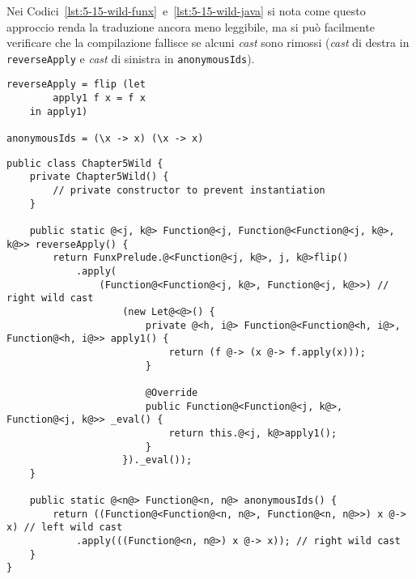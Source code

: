 \newpage

Nei Codici~\ref{lst:5-15-wild-funx}~e~\ref{lst:5-15-wild-java} si nota come questo approccio renda la traduzione ancora meno
leggibile, ma si può facilmente verificare che la compilazione fallisce se alcuni \textit{cast} sono rimossi
(\textit{cast} di destra in \texttt{reverseApply} e \textit{cast} di sinistra in \texttt{anonymousIds}).

\vspace{4mm}
\begin{lstlisting}[caption={Applicazione tra funzioni, espressioni \texttt{let} e \texttt{lambda}}, style=funxCode, label={lst:5-15-wild-funx}]
reverseApply = flip (let
        apply1 f x = f x
    in apply1)

anonymousIds = (\x -> x) (\x -> x)
\end{lstlisting}
\vspace{4mm}
\begin{lstlisting}[caption={Traduzione in \texttt{Java} con \textit{cast} "selvaggi"}, style=javaCode, label={lst:5-15-wild-java}]
public class Chapter5Wild {
    private Chapter5Wild() {
        // private constructor to prevent instantiation
    }
    
    public static @<j, k@> Function@<j, Function@<Function@<j, k@>, k@>> reverseApply() {
        return FunxPrelude.@<Function@<j, k@>, j, k@>flip()
            .apply(
                (Function@<Function@<j, k@>, Function@<j, k@>>) // right wild cast
                    (new Let@<@>() {
                        private @<h, i@> Function@<Function@<h, i@>, Function@<h, i@>> apply1() {
                            return (f @-> (x @-> f.apply(x)));
                        }
    
                        @Override
                        public Function@<Function@<j, k@>, Function@<j, k@>> _eval() {
                            return this.@<j, k@>apply1();
                        }
                    })._eval());
    }
    
    public static @<n@> Function@<n, n@> anonymousIds() {
        return ((Function@<Function@<n, n@>, Function@<n, n@>>) x @-> x) // left wild cast
            .apply(((Function@<n, n@>) x @-> x)); // right wild cast
    }
}
\end{lstlisting}